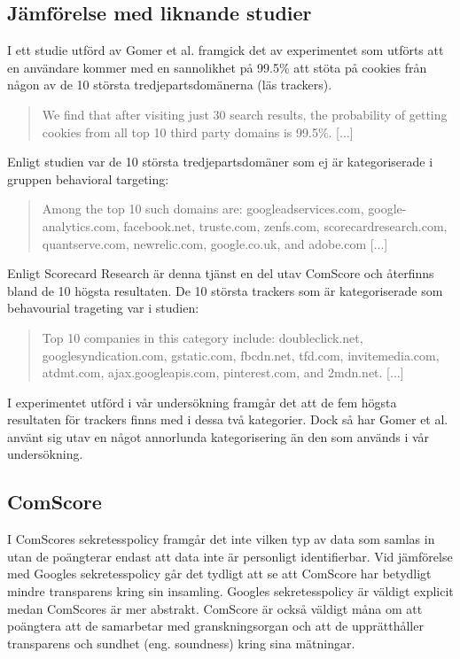 \documentclass[a4paper,11pt]{article}
\begin{document}
{\subsection{Jämförelse med liknande studier}
I ett studie utförd av Gomer et al. \cite{Gomer} framgick det av experimentet som utförts att en användare kommer med en sannolikhet på 99.5\% att stöta på cookies från någon av de 10 största tredjepartsdomänerna (läs trackers).

\begin{quote}
We find that after visiting just 30 search results, the probability of getting cookies from all top 10 third party domains is 99.5\%. [...]
\end{quote}
Enligt studien var de 10 största tredjepartsdomäner som ej är kategoriserade i gruppen behavioral targeting:

\begin{quote}
Among the top 10 such domains are: googleadservices.com, google-analytics.com, facebook.net, truste.com, zenfs.com, scorecardresearch.com, quantserve.com, newrelic.com, google.co.uk, and adobe.com [...]
\end{quote}

Enligt Scorecard Research \cite{Scorecard} är denna tjänst en del utav ComScore och återfinns bland de 10 högsta resultaten. De 10 största trackers som är kategoriserade som behavourial trageting var i studien:

\begin{quote}
Top 10 companies in this category include: doubleclick.net, googlesyndication.com, gstatic.com, fbcdn.net, tfd.com, invitemedia.com, atdmt.com, ajax.googleapis.com, pinterest.com, and 2mdn.net. [...]
\end{quote}
I experimentet utförd i vår undersökning framgår det att de fem högsta resultaten för trackers finns med i dessa två kategorier. Dock så har Gomer et al. \cite{Gomer} använt sig utav en något annorlunda kategorisering än den som används i vår undersökning. 

\subsection{ComScore}
I ComScores sekretesspolicy framgår det inte vilken typ av data som samlas in utan de poängterar endast att data inte är personligt identifierbar. Vid jämförelse med Googles sekretesspolicy går det tydligt att se att ComScore har betydligt mindre transparens kring sin insamling. Googles sekretesspolicy är väldigt explicit medan ComScores är mer abstrakt. ComScore är också väldigt måna om att poängtera att de samarbetar med granskningsorgan och att de upprätthåller transparens och sundhet (eng. soundness) kring sina mätningar.

}
\end{document}
